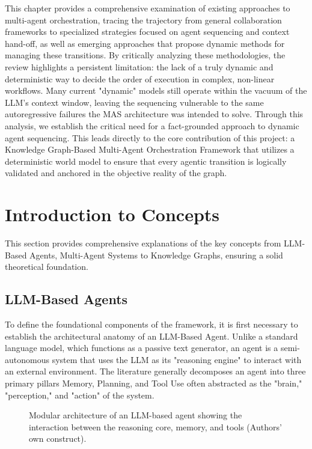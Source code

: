 This chapter provides a comprehensive examination of existing approaches to multi-agent orchestration, tracing the trajectory from general collaboration frameworks to specialized strategies focused on agent sequencing and context hand-off, as well as emerging approaches that propose dynamic methods for managing these transitions. By critically analyzing these methodologies, the review highlights a persistent limitation: the lack of a truly dynamic and deterministic way to decide the order of execution in complex, non-linear workflows. Many current "dynamic" models still operate within the vacuum of the LLM’s context window, leaving the sequencing vulnerable to the same autoregressive failures the MAS architecture was intended to solve. Through this analysis, we establish the critical need for a fact-grounded approach to dynamic agent sequencing. This leads directly to the core contribution of this project: a Knowledge Graph-Based Multi-Agent Orchestration Framework that utilizes a deterministic world model to ensure that every agentic transition is logically validated and anchored in the objective reality of the graph.

\section{Introduction to Concepts}
This section provides comprehensive explanations of the key concepts from LLM-Based Agents, Multi-Agent Systems to Knowledge Graphs, ensuring a solid theoretical foundation.

\subsection{LLM-Based Agents}
To define the foundational components of the framework, it is first necessary to establish the architectural anatomy of an LLM-Based Agent. Unlike a standard language model, which functions as a passive text generator, an agent is a semi-autonomous system that uses the LLM as its "reasoning engine" to interact with an external environment. The literature \citet{xi2023risepotentiallargelanguage} generally decomposes an agent into three primary pillars Memory, Planning, and Tool Use often abstracted as the "brain," "perception," and "action" of the system. 

\begin{figure}[h!]
    \centering
     
\caption{Modular architecture of an LLM-based agent showing the interaction between the reasoning core, memory, and tools (Authors’ own construct).}    \label{fig:agent_architecture}
\end{figure}

